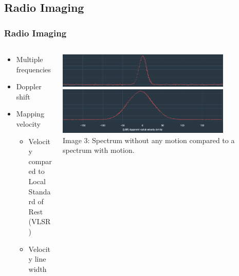 \documentclass[aspectratio=169,compress]{beamer}
\newcommand\teeny{\fontsize{3pt}{3.6pt}\selectfont}
\begin{document}
\subsection{Radio Imaging}
\begin{frame}
  \frametitle{Radio Imaging}
  \begin{columns}
    \begin{column}{0.5\textwidth}
      \begin{itemize}
        \item Multiple frequencies
        \item Doppler shift
        \item Mapping velocity
          \begin{itemize}
            \item Velocity compared to Local Standard of Rest (VLSR)
            \item Velocity line width
          \end{itemize}
      \end{itemize}
    \end{column}
    \begin{column}{0.5\textwidth}
      \includegraphics[width=0.8\textwidth]{figures/noturbspec.png}
      \includegraphics[width=0.8\textwidth]{figures/demospec.png}
      {\teeny\\ Image 3: Spectrum without any motion compared to a spectrum with motion.}
    \end{column}
  \end{columns}
\end{frame}
\end{document}
